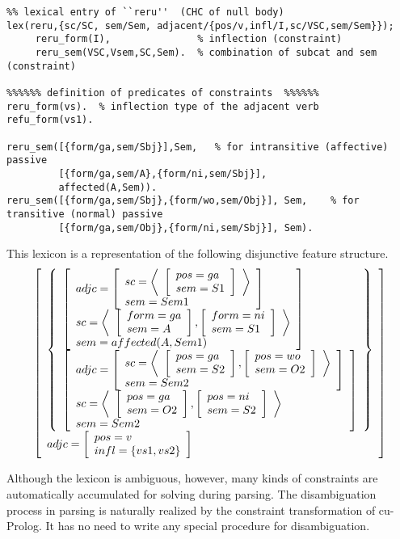 \begin{verbatim}
%% lexical entry of ``reru''  (CHC of null body)
lex(reru,{sc/SC, sem/Sem, adjacent/{pos/v,infl/I,sc/VSC,sem/Sem}});
     reru_form(I),               % inflection (constraint)
     reru_sem(VSC,Vsem,SC,Sem).  % combination of subcat and sem (constraint)

%%%%%% definition of predicates of constraints  %%%%%%
reru_form(vs).  % inflection type of the adjacent verb
refu_form(vs1). 

reru_sem([{form/ga,sem/Sbj}],Sem,   % for intransitive (affective) passive
         [{form/ga,sem/A},{form/ni,sem/Sbj}],
         affected(A,Sem)). 
reru_sem([{form/ga,sem/Sbj},{form/wo,sem/Obj}], Sem,    % for transitive (normal) passive
         [{form/ga,sem/Obj},{form/ni,sem/Sbj}], Sem). 
\end{verbatim}

This lexicon is a representation of the following disjunctive feature
structure.
\[
\left[ \begin{array}{l}
	\left \{ \begin{array}{l}
	\left[ \begin{array}{l}
		adjc = \left[ \begin{array}{l}
			sc = \left \langle \begin{array}{l} 
					\left[ \begin{array}{l} pos=ga\\sem=S1 \end{array} \right]
				     \end{array} \right \rangle\\
				sem = Sem1\\
			  \end{array} \right]\\
		sc = \left \langle \begin{array}{l} \left[ \begin{array}{l} form=ga\\sem=A \end{array} \right], 
			\left[ \begin{array}{l} form=ni\\sem=S1 \end{array} \right] \end{array} \right \rangle\\
		sem = affected(A,Sem1)\\
	\end{array} \right]\\
	\left[ \begin{array}{l}
		adjc = \left[ \begin{array}{l}
				sc = \left \langle \begin{array}{l} 
					\left[ \begin{array}{l} pos=ga\\sem=S2\end{array} \right],
					\left[ \begin{array}{l} pos=wo\\sem=O2\end{array} \right] 
					\end{array} \right \rangle\\
				sem = Sem2\\
			   \end{array} \right]\\
		sc = \left \langle \begin{array}{l} 
			\left[ \begin{array}{l} pos=ga\\sem=O2\end{array} \right],
			\left[ \begin{array}{l} pos=ni\\sem=S2\end{array} \right] 
		     \end{array} \right \rangle\\
		sem = Sem2\\
	\end{array} \right]
	\end{array} \right \} \\
	adjc = \left[ \begin{array}{l} pos=v\\ infl=\{vs1,vs2\} \end{array} \right]
\end{array} \right]
\] 

Although the lexicon is ambiguous, however,  
many kinds of constraints are automatically accumulated for solving 
during parsing.
The disambiguation process in parsing 
is naturally realized by the constraint
transformation of cu-Prolog. 
It has no need to write any special procedure for disambiguation.

